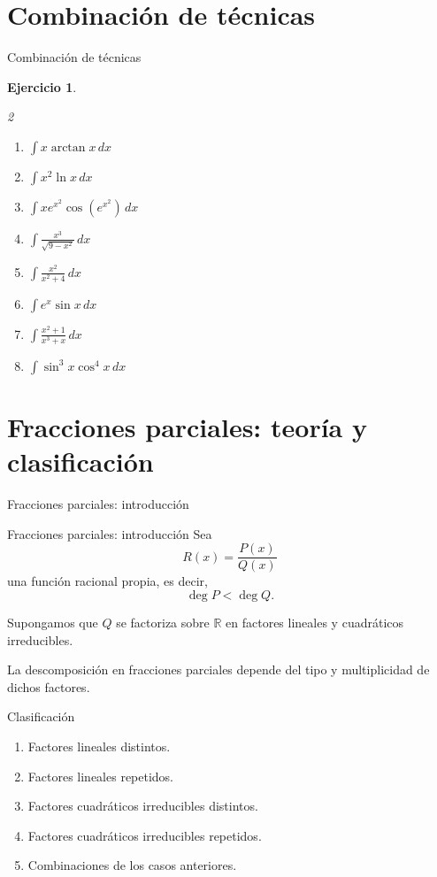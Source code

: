\documentclass[10pt,aspectratio=169]{beamer}
\newtheorem{Ejer}{Ejercicio}
\begin{document}
\section{Combinación de técnicas}
\begin{frame}{Combinación de técnicas}
\begin{Ejer}
\begin{multicols}{2}
\begin{enumerate}
\item $\displaystyle \int x\arctan x\,dx$
\item $\displaystyle \int x^2\ln x\,dx$
\item $\displaystyle \int x e^{x^2}\cos(e^{x^2})\,dx$
\item $\displaystyle \int \frac{x^3}{\sqrt{9-x^2}}\,dx$
\item $\displaystyle \int \frac{x^2}{x^2+4}\,dx$
\item $\displaystyle \int e^x\sin x\,dx$
\item $\displaystyle \int \frac{x^2+1}{x^3+x}\,dx$
\item $\displaystyle \int \sin^3x\cos^4x\,dx$
\end{enumerate}
\end{multicols}
\end{Ejer}
\end{frame}
\section{Fracciones parciales: teoría y clasificación}

\begin{frame}{Fracciones parciales: introducción}
\end{frame}


\begin{frame}{Fracciones parciales: introducción}
\small
Sea
\[
R(x)=\frac{P(x)}{Q(x)}
\]
una función racional propia, es decir,
\[
\deg P<\deg Q.
\]

Supongamos que $Q$ se factoriza sobre $\mathbb{R}$
en factores lineales y cuadráticos irreducibles.

La descomposición en fracciones parciales depende
del tipo y multiplicidad de dichos factores.

\begin{block}{Clasificación}
\begin{enumerate}
\item Factores lineales distintos.
\item Factores lineales repetidos.
\item Factores cuadráticos irreducibles distintos.
\item Factores cuadráticos irreducibles repetidos.
\item Combinaciones de los casos anteriores.
\end{enumerate}
\end{block}
\end{frame}
\end{document}
